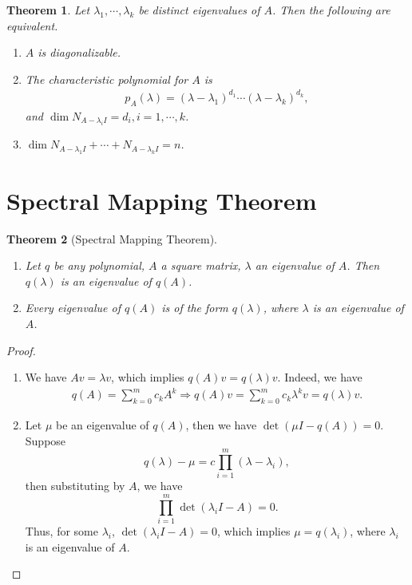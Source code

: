\documentclass[11pt]{book}
\newtheorem{theorem}{Theorem}[section]
\theoremstyle{definition}
\numberwithin{equation}{chapter}
\begin{document}
\medskip

\begin{theorem}
Let $\lambda_1, \cdots, \lambda_k$ be distinct eigenvalues of $A$. Then the following are equivalent.
\begin{enumerate}[label=(\alph*)]
    \item $A$ is diagonalizable. 
    
    \item The characteristic polynomial for $A$ is 
    \begin{align*}
        p_A(\lambda) = (\lambda - \lambda_1)^{d_1} \cdots (\lambda - \lambda_k)^{d_k},
    \end{align*}
    and $\dim N_{A - \lambda_i I} = d_i, i = 1, \cdots, k$.
    
    \item $\dim N_{A - \lambda_1 I} + \cdots + N_{A - \lambda_k I} = n$.
\end{enumerate}
\end{theorem}



\medskip
\section{Spectral Mapping Theorem}
\begin{theorem}[Spectral Mapping Theorem]
~\begin{enumerate}[label=(\alph*)]
    \item Let $q$ be any polynomial, $A$ a square matrix, $\lambda$ an eigenvalue of $A$. Then $q(\lambda)$ is an eigenvalue of $q(A)$.
    \item Every eigenvalue of $q(A)$ is of the form $q(\lambda)$, where $\lambda$ is an eigenvalue of $A$.
\end{enumerate}
\end{theorem}
\begin{proof}
~\begin{enumerate}[label=(\alph*)]
    \item We have $Av = \lambda v$, which implies $q(A)v = q(\lambda)v$. Indeed, we have
    \begin{align*}
        q(A) = \sum^m_{k=0} c_k A^k \Rightarrow q(A)v = \sum^m_{k=0} c_k \lambda^k v = q(\lambda)v.
    \end{align*}
    \item Let $\mu$ be an eigenvalue of $q(A)$, then we have $\det (\mu I - q(A)) = 0$. Suppose $$q(\lambda) - \mu = c\prod^m_{i=1}(\lambda - \lambda_i),$$ 
    then substituting by $A$, we have $$\prod^m_{i=1} \det (\lambda_i I - A) = 0.$$
    Thus, for some $\lambda_i$, $\det (\lambda_i I - A) = 0$, which implies $\mu = q(\lambda_i)$, where $\lambda_i$ is an eigenvalue of $A$. 
\end{enumerate}
\end{proof}
\end{document}

